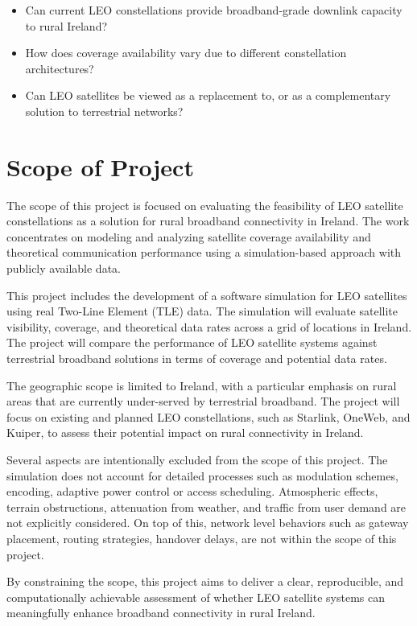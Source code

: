 \begin{itemize}
    \item Can current LEO constellations provide broadband-grade downlink capacity to rural Ireland? 
    \item How does coverage availability vary due to different constellation architectures?
    \item Can LEO satellites be viewed as a replacement to, or as a complementary solution to terrestrial networks?
\end{itemize}
\section{Scope of Project}
The scope of this project is focused on evaluating the feasibility of LEO satellite constellations as a solution for rural broadband connectivity in Ireland. The work concentrates on modeling and analyzing satellite coverage availability and theoretical communication performance using a simulation-based approach with publicly available data. 

This project includes the development of a software simulation for LEO satellites using real Two-Line Element (TLE) data. The simulation will evaluate satellite visibility, coverage, and theoretical data rates across a grid of locations in Ireland. The project will compare the performance of LEO satellite systems against terrestrial broadband solutions in terms of coverage and potential data rates.

The geographic scope is limited to Ireland, with a particular emphasis on rural areas that are currently under-served by terrestrial broadband. The project will focus on existing and planned LEO constellations, such as Starlink, OneWeb, and Kuiper, to assess their potential impact on rural connectivity in Ireland.

Several aspects are intentionally excluded from the scope of this project. The simulation does not account for detailed processes such as modulation schemes, 
encoding, adaptive power control or access scheduling. Atmospheric effects, terrain obstructions, attenuation from weather, and traffic from user demand are not explicitly considered. On top of this, network level behaviors such as gateway placement, routing strategies, handover delays, are not within the scope of this project. 

By constraining the scope, this project aims to deliver a clear, reproducible, and computationally achievable assessment of whether LEO satellite systems can meaningfully enhance broadband connectivity in rural Ireland.

